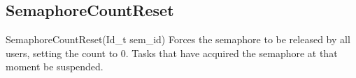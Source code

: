 \subsection{SemaphoreCountReset}
\label{func:SemaphoreCountReset}
\begin{pdfunction}
{SemaphoreCountReset(Id\_t sem\_id) }
{ 
Forces the semaphore to be released by all users, setting the 
count to 0. Tasks that have acquired the semaphore at that moment 
be suspended. }
\end{pdfunction}
